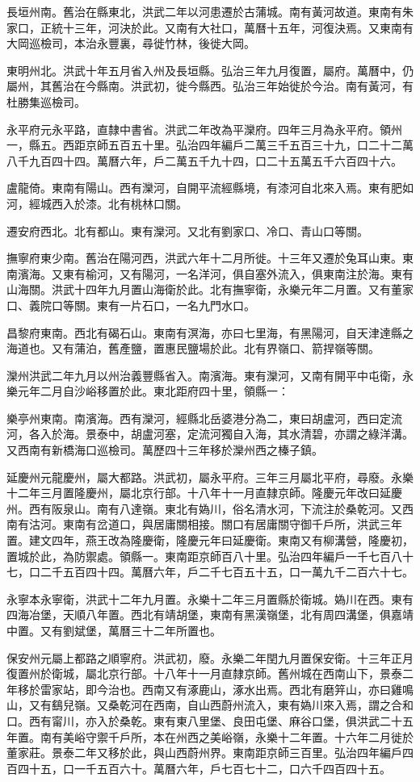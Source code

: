 長垣州南。舊治在縣東北，洪武二年以河患遷於古蒲城。南有黃河故道。東南有朱家口，正統十三年，河決於此。又南有大社口，萬曆十五年，河復決焉。又東南有大岡巡檢司，本治永豐裏，尋徙竹林，後徙大岡。

東明州北。洪武十年五月省入州及長垣縣。弘治三年九月復置，屬府。萬曆中，仍屬州，其舊治在今縣南。洪武初，徙今縣西。弘治三年始徙於今治。南有黃河，有杜勝集巡檢司。

永平府元永平路，直隸中書省。洪武二年改為平灤府。四年三月為永平府。領州一，縣五。西距京師五百五十里。弘治四年編戶二萬三千五百三十九，口二十二萬八千九百四十四。萬曆六年，戶二萬五千九十四，口二十五萬五千六百四十六。

盧龍倚。東南有陽山。西有灤河，自開平流經縣境，有漆河自北來入焉。東有肥如河，經城西入於漆。北有桃林口關。

遷安府西北。北有都山。東有灤河。又北有劉家口、冷口、青山口等關。

撫寧府東少南。舊治在陽河西，洪武六年十二月所徙。十三年又遷於兔耳山東。東南濱海。又東有榆河，又有陽河，一名洋河，俱自塞外流入，俱東南注於海。東有山海關。洪武十四年九月置山海衛於此。北有撫寧衛，永樂元年二月置。又有董家口、義院口等關。東有一片石口，一名九門水口。

昌黎府東南。西北有碣石山。東南有溟海，亦曰七里海，有黑陽河，自天津達縣之海道也。又有蒲泊，舊產鹽，置惠民鹽場於此。北有界嶺口、箭捍嶺等關。

灤州洪武二年九月以州治義豐縣省入。南濱海。東有灤河，又南有開平中屯衛，永樂元年二月自沙峪移置於此。東北距府四十里，領縣一：

樂亭州東南。南濱海。西有灤河，經縣北岳婆港分為二，東曰胡盧河，西曰定流河，各入於海。景泰中，胡盧河塞，定流河獨自入海，其水清碧，亦謂之綠洋溝。又西南有新橋海口巡檢司。萬歷四十三年移於灤州西之榛子鎮。

延慶州元龍慶州，屬大都路。洪武初，屬永平府。三年三月屬北平府，尋廢。永樂十二年三月置隆慶州，屬北京行部。十八年十一月直隸京師。隆慶元年改曰延慶州。西有阪泉山。南有八達嶺。東北有媯川，俗名清水河，下流注於桑乾河。又西南有沽河。東南有岔道口，與居庸關相接。關口有居庸關守御千戶所，洪武三年置。建文四年，燕王改為隆慶衛，隆慶元年曰延慶衛。東南又有柳溝營，隆慶初，置城於此，為防禦處。領縣一。東南距京師百八十里。弘治四年編戶一千七百八十七，口二千五百四十四。萬曆六年，戶二千七百五十五，口一萬九千二百六十七。

永寧本永寧衛，洪武十二年九月置。永樂十二年三月置縣於衛城。媯川在西。東有四海冶堡，天順八年置。西北有靖胡堡，東南有黑漢嶺堡，北有周四溝堡，俱嘉靖中置。又有劉斌堡，萬曆三十二年所置也。

保安州元屬上都路之順寧府。洪武初，廢。永樂二年閏九月置保安衛。十三年正月復置州於衛城，屬北京行部。十八年十一月直隸京師。舊州城在西南山下，景泰二年移於雷家站，即今治也。西南又有涿鹿山，涿水出焉。西北有磨笄山，亦曰雞鳴山，又有鷂兒嶺。又桑乾河在西南，自山西蔚州流入，東有媯川來入焉，謂之合和口。西有甯川，亦入於桑乾。東有東八里堡、良田屯堡、麻谷口堡，俱洪武二十五年置。南有美峪守禦千戶所，本在州西之美峪嶺，永樂十二年置。十六年二月徙於董家莊。景泰二年又移於此，與山西蔚州界。東南距京師三百里。弘治四年編戶四百四十五，口一千五百六十。萬曆六年，戶七百七十二，口六千四百四十五。

